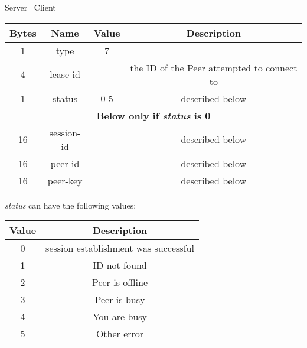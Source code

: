 \begin{center}
    Server \textrightarrow\ Client\\
    \begin{tabular}{|c|c|c|c|}
        \hline
        \textbf{Bytes} & \textbf{Name} & \textbf{Value} & \textbf{Description}                       \\
        \hline
        1              & type          & 7              &                                            \\
        \hline
        4              & lease-id      &                & the ID of the Peer attempted to connect to \\
        \hline
        1              & status        & 0-5            & described below                            \\
        \hline
        \multicolumn{4}{|c|}{\textbf{Below only if \emph{status} is 0} } \\
        \hline
        16             & session-id    &                & described below                            \\
        \hline
        16             & peer-id       &                & described below                            \\
        \hline
        16             & peer-key      &                & described below                            \\
        \hline
    \end{tabular}
\end{center}

\emph{status} can have the following values:

\begin{center}
    \begin{tabular}{|c|c|}
        \hline
        \textbf{Value} & \textbf{Description}                 \\
        \hline
        0              & session establishment was successful \\
        \hline
        1              & ID not found                         \\
        \hline
        2              & Peer is offline                      \\
        \hline
        3              & Peer is busy                         \\
        \hline
        4              & You are busy                         \\
        \hline
        5              & Other error                          \\
        \hline
    \end{tabular}
\end{center}

